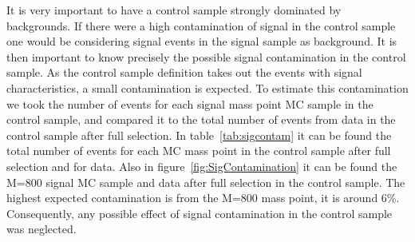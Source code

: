 It is very important to have a control sample strongly dominated by backgrounds. If there were a high contamination of signal in the control sample one would be considering signal events in the signal sample as background. It is then important to know precisely the possible signal contamination in the control sample. As the control sample definition takes out the events with signal characteristics, a small contamination is expected. To estimate this contamination we took the number of events for each signal mass point MC sample in the control sample, and compared it to the total number of events from data in the control sample after full selection. In table~\ref{tab:sigcontam} it can be found the total number of events for each MC mass point in the control sample after full selection and for data. Also in figure~\ref{fig:SigContamination} it can be found the M=800 \GeVcc signal MC sample and data after full selection in the control sample. The highest expected contamination is from the M=800 \GeVcc mass point, it is around 6\%. Consequently, any possible effect of signal contamination in the control sample was neglected. 

\begin{table*}[htbH]
\begin{center}
\caption{Number of events in the control sample for MC signal samples and data after full selection in a window corresponding to one $\sigma$ for each mass point, as it will be explained in section~\ref{sec:sys}. The contamination is evaluated as the ratio of the number of events in the control sample for each mass point and data. \label{tab:sigcontam}}
\end{center}
\end{table*}

